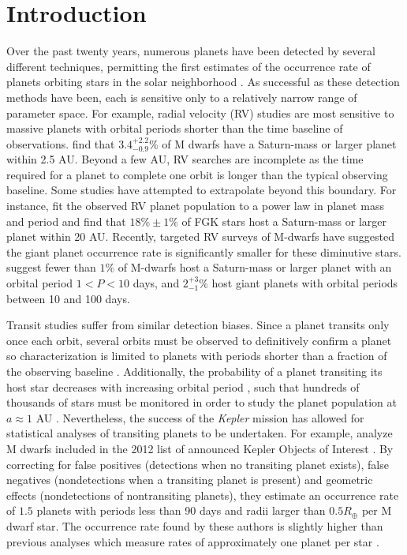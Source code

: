 \section{Introduction}

Over the past twenty years, numerous planets have been detected by several different techniques, permitting the first estimates of the occurrence rate of planets orbiting stars in the solar neighborhood \citep[e.g.][]{Johnson10b, Howard10b, Gould10, Vigan12}. As successful as these detection methods have been, each is sensitive only to a relatively narrow range of parameter space. For example, radial velocity (RV) studies are most sensitive to massive planets with orbital periods shorter than the time baseline of observations. %
\citet{Johnson10b} find that $3.4^{+2.2}_{-0.9}\%$ of M dwarfs have a Saturn-mass or larger planet within 2.5 AU. Beyond a few AU, RV searches are incomplete as the time required for a planet to complete one orbit is longer than the typical observing baseline. Some studies have attempted to extrapolate beyond this boundary. For instance, \citet{Cumming08} fit the observed RV planet population to a power law in planet mass and period and find that $18\% \pm 1\%$ of FGK stars host a Saturn-mass or larger planet within 20 AU. Recently, targeted RV surveys of M-dwarfs have suggested the giant planet occurrence rate is significantly smaller for these diminutive stars. \citet{Bonfils13} suggest fewer than $1\%$ of M-dwarfs host a Saturn-mass or larger planet with an orbital period $1 < P < 10$ days, and $2^{+3}_{-1}\%$ host giant planets with orbital periods between 10 and 100 days.

Transit studies suffer from similar detection biases. Since a planet transits only once each orbit, several orbits must be observed to definitively confirm a planet so characterization is limited to planets with periods shorter than a fraction of the observing baseline \citep{Gaudi05}. Additionally, the probability of a planet transiting its host star decreases with increasing orbital period \citep{Winn11}, such that hundreds of thousands of stars must be monitored in order to study the planet population at $a \approx 1$ AU \citep{Borucki84}. Nevertheless, the success of the \textit{Kepler} mission \citep{Borucki10, Koch10} has allowed for statistical analyses of transiting planets to be undertaken. For example, \citet{Morton14} analyze M dwarfs included in the 2012 list of announced Kepler Objects of Interest \citep[KOIs,][]{Batalha13}. By correcting for false positives (detections when no transiting planet exists), false negatives (nondetections when a transiting planet is present) and geometric effects (nondetections of nontransiting planets), they estimate an occurrence rate of $1.5$ planets with periods less than 90 days and radii larger than $0.5R_\oplus$ per M dwarf star. The occurrence rate found by these authors is slightly higher than previous analyses which measure rates of approximately one planet per star \citep{Youdin11, Mann12, Swift13, Dressing13}.

